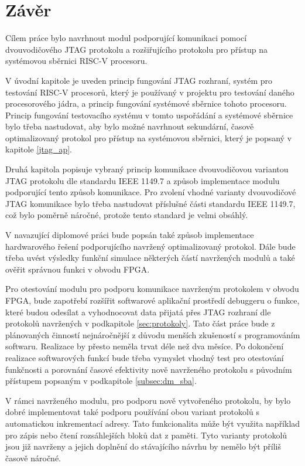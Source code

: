 \chapter*{Závěr}
{}

Cílem práce bylo navrhnout modul podporující komunikaci pomocí dvouvodičového \acs{JTAG} protokolu a rozšiřujícího protokolu pro přístup na systémovou sběrnici \acs{RISC-V} procesoru.

V úvodní kapitole je uveden princip fungování \acs{JTAG} rozhraní, systém pro testování \acs{RISC-V} procesorů, který je používaný v projektu pro testování daného procesorového jádra, a princip fungování systémové sběrnice tohoto procesoru. Princip fungování testovacího systému v tomto uspořádání a systémové sběrnice bylo třeba nastudovat, aby bylo možné navrhnout sekundární, časově optimalizovaný protokol pro přístup na systémovou sběrnici, který je popsaný v kapitole \ref{jtag_ap}.

Druhá kapitola popisuje vybraný princip komunikace dvouvodičovou variantou \acs{JTAG} protokolu dle standardu IEEE 1149.7 a způsob implementace modulu podporující tento způsob komunikace. Pro zvolení vhodné varianty dvouvodičové \acs{JTAG} komunikace bylo třeba nastudovat příslušné části standardu IEEE 1149.7, což bylo poměrně náročné, protože tento standard je velmi obsáhlý.

V navazující diplomové práci bude popsán také způsob implementace hardwarového řešení podporujícího navržený optimalizovaný protokol. Dále bude třeba uvést výsledky funkční simulace některých částí navržených modulů a také ověřit správnou funkci v obvodu \acs{FPGA}.

Pro otestování modulu pro podporu komunikace navrženým protokolem v obvodu \acs{FPGA}, bude zapotřebí rozšířit softwarové aplikační prostředí debuggeru o funkce, které budou odesílat a vyhodnocovat data přijatá přes \acs{JTAG} rozhraní dle protokolů navržených v podkapitole \ref{sec:protokoly}. Tato část práce bude z plánovaných činností nejnáročnější z důvodu menších zkušeností s programováním softwaru. Realizace by přesto neměla trvat déle než dva měsíce. Po dokončení realizace softwarových funkcí bude třeba vymyslet vhodný test pro otestování funkčnosti a porovnání časové efektivity nově navrženého protokolu s původním přístupem popsaným v podkapitole \ref{subsec:dm_sba}.

V rámci navrženého modulu, pro podporu nově vytvořeného protokolu, by bylo dobré implementovat také podporu používání obou variant protokolů s automatickou inkrementací adresy. Tato funkcionalita může být využita například pro zápis nebo čtení rozsáhlejších bloků dat z paměti. Tyto varianty protokolů jsou již navrženy a jejich doplnění do stávajícího návrhu by nemělo být příliš časově náročné.